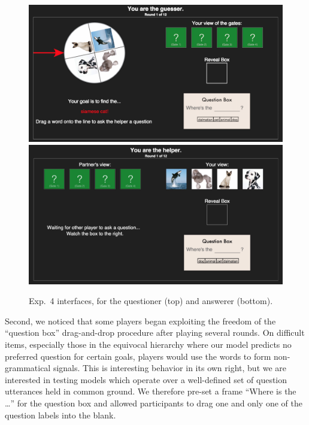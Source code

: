\documentclass[12pt, floatsintext, jou]{apa6}
\begin{document}
	\begin{figure}[t!]
\begin{center}
\includegraphics[scale = .3]{Exp4GuesserViewStart}
\includegraphics[scale = .15]{Exp4HelperViewStart}
\end{center}
\vspace{-.5cm}
\caption{Exp.~4 interfaces, for the questioner (top) and answerer (bottom).}
\vspace{-.1cm}
\label{fig:exp4views}
\end{figure}

Second, we noticed that some players began exploiting the freedom of the ``question box'' drag-and-drop procedure after playing several rounds. On difficult items, especially those in the equivocal hierarchy where our model predicts no preferred question for certain goals, players would use the words to form non-grammatical signals. This is interesting behavior in its own right, but we are interested in testing models which operate over a well-defined set of question utterances held in common ground. We therefore pre-set a frame ``Where is the \dots'' for the question box and allowed participants to drag one and only one of the question labels into the blank. 
\end{document}
